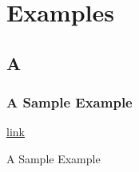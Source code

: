 \setcounter{chapter}{1}
\chapter{Examples}
\section{A}

\subsection{A Sample Example}\hyperref[sec:5]{link}

A Sample Example